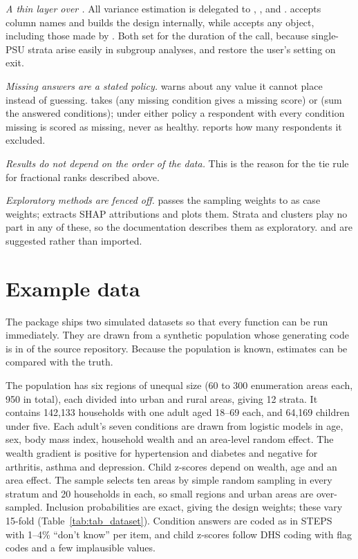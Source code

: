 \emph{A thin layer over .} All variance estimation is delegated to , ,  and .  accepts column names and builds the design internally, while  accepts any  object, including those made by . Both set  for the duration of the call, because single-PSU strata arise easily in subgroup analyses, and restore the user's setting on exit.

\emph{Missing answers are a stated policy.}  warns about any value it cannot place instead of guessing.  takes  (any missing condition gives a missing score) or  (sum the answered conditions); under either policy a respondent with every condition missing is scored as missing, never as healthy.  reports how many respondents it excluded.

\emph{Results do not depend on the order of the data.} This is the reason for the tie rule for fractional ranks described above.

\emph{Exploratory methods are fenced off.}  passes the sampling weights to  \citep{chen2016} as case weights;  extracts SHAP attributions \citep{lundberg2017} and  plots them. Strata and clusters play no part in any of these, so the documentation describes them as exploratory.  and  \citep{pebesma2018} are suggested rather than imported.

\section{Example data}

The package ships two simulated datasets so that every function can be run immediately. They are drawn from a synthetic population whose generating code is in  of the source repository. Because the population is known, estimates can be compared with the truth.

The population has six regions of unequal size (60 to 300 enumeration areas each, 950 in total), each divided into urban and rural areas, giving 12 strata. It contains 142,133 households with one adult aged 18--69 each, and 64,169 children under five. Each adult's seven conditions are drawn from logistic models in age, sex, body mass index, household wealth and an area-level random effect. The wealth gradient is positive for hypertension and diabetes and negative for arthritis, asthma and depression. Child z-scores depend on wealth, age and an area effect. The sample selects ten areas by simple random sampling in every stratum and 20 households in each, so small regions and urban areas are over-sampled. Inclusion probabilities are exact, giving the design weights; these vary 15-fold (Table~\ref{tab:tab_dataset}). Condition answers are coded as in STEPS with 1--4\% ``don't know'' per item, and child z-scores follow DHS coding with flag codes and a few implausible values.


